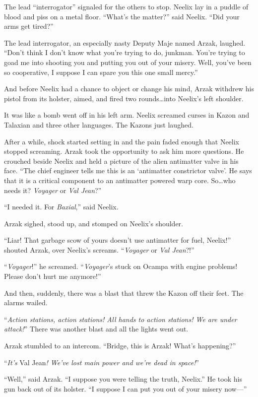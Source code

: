 \documentclass[twoside,letterpaper,12pt]{memoir}
\begin{document}
The lead ``interrogator'' signaled for the others to stop. Neelix lay in a puddle of blood and piss on a metal floor. ``What's the matter?'' said Neelix. ``Did your arms get tired?''

The lead interrogator, an especially nasty Deputy Maje named Arzak, laughed. ``Don't think I don't know what you're trying to do, junkman. You're trying to goad me into shooting you and putting you out of your misery. Well, you've been so cooperative, I suppose I can spare you this one small mercy.''

And before Neelix had a chance to object or change his mind, Arzak withdrew his pistol from its holster, aimed, and fired two rounds\ldots into Neelix's left shoulder.

It was like a bomb went off in his left arm. Neelix screamed curses in Kazon and Talaxian and three other languages. The Kazons just laughed.

After a while, shock started setting in and the pain faded enough that Neelix stopped screaming. Arzak took the opportunity to ask him more questions. He crouched beside Neelix and held a picture of the alien antimatter valve in his face. ``The chief engineer tells me this is an ‘antimatter constrictor valve’. He says that it is a critical component to an antimatter powered warp core. So\ldots who needs it? \textit{Voyager} or \textit{Val Jean}?''

``I needed it. For \textit{Baxial},'' said Neelix.

Arzak sighed, stood up, and stomped on Neelix's shoulder.

``Liar! That garbage scow of yours doesn't use antimatter for fuel, Neelix!'' shouted Arzak, over Neelix's screams. ``\textit{Voyager} or \textit{Val Jean}?!''

``\textit{Voyager}!'' he screamed. ``\textit{Voyager}’s stuck on Ocampa with engine problems! Please don’t hurt me anymore!''

And then, suddenly, there was a blast that threw the Kazon off their feet. The alarms wailed.

``\textit{Action stations, action stations! All hands to action stations! We are under attack!}'' There was another blast and all the lights went out.

Arzak stumbled to an intercom. ``Bridge, this is Arzak! What's happening?''

``\textit{It's }Val Jean\textit{! We've lost main power and we're dead in space!}''

``Well,'' said Arzak. ``I suppose you were telling the truth, Neelix.'' He took his gun back out of its holster. ``I suppose I can put you out of your misery now---''
\end{document}
